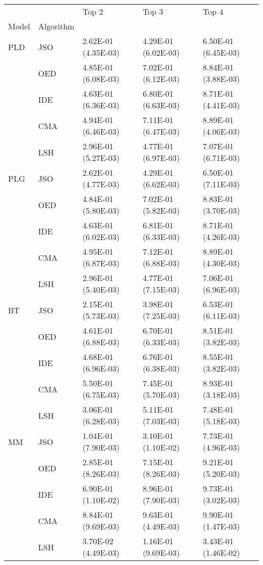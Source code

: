\begin{tabular}{lllll}
\toprule
   &     &                Top 2 &                Top 3 &                Top 4 \\
Model & Algorithm &                      &                      &                      \\
\midrule
PLD & JSO &  2.62E-01 (4.35E-03) &  4.29E-01 (6.02E-03) &  6.50E-01 (6.45E-03) \\
   & OED &  4.85E-01 (6.08E-03) &  7.02E-01 (6.12E-03) &  8.84E-01 (3.88E-03) \\
   & IDE &  4.63E-01 (6.36E-03) &  6.80E-01 (6.63E-03) &  8.71E-01 (4.41E-03) \\
   & CMA &  4.94E-01 (6.46E-03) &  7.11E-01 (6.47E-03) &  8.89E-01 (4.06E-03) \\
   & LSH &  2.96E-01 (5.27E-03) &  4.77E-01 (6.97E-03) &  7.07E-01 (6.71E-03) \\
PLG & JSO &  2.62E-01 (4.77E-03) &  4.29E-01 (6.62E-03) &  6.50E-01 (7.11E-03) \\
   & OED &  4.84E-01 (5.80E-03) &  7.02E-01 (5.82E-03) &  8.83E-01 (3.70E-03) \\
   & IDE &  4.63E-01 (6.02E-03) &  6.81E-01 (6.33E-03) &  8.71E-01 (4.26E-03) \\
   & CMA &  4.95E-01 (6.87E-03) &  7.12E-01 (6.88E-03) &  8.89E-01 (4.30E-03) \\
   & LSH &  2.96E-01 (5.40E-03) &  4.77E-01 (7.15E-03) &  7.06E-01 (6.96E-03) \\
BT & JSO &  2.15E-01 (5.73E-03) &  3.98E-01 (7.25E-03) &  6.53E-01 (6.11E-03) \\
   & OED &  4.61E-01 (6.88E-03) &  6.70E-01 (6.33E-03) &  8.51E-01 (3.82E-03) \\
   & IDE &  4.68E-01 (6.96E-03) &  6.76E-01 (6.38E-03) &  8.55E-01 (3.82E-03) \\
   & CMA &  5.50E-01 (6.75E-03) &  7.45E-01 (5.70E-03) &  8.93E-01 (3.18E-03) \\
   & LSH &  3.06E-01 (6.28E-03) &  5.11E-01 (7.03E-03) &  7.48E-01 (5.18E-03) \\
MM & JSO &  1.04E-01 (7.90E-03) &  3.10E-01 (1.10E-02) &  7.73E-01 (4.96E-03) \\
   & OED &  2.85E-01 (8.26E-03) &  7.15E-01 (8.26E-03) &  9.21E-01 (5.20E-03) \\
   & IDE &  6.90E-01 (1.10E-02) &  8.96E-01 (7.90E-03) &  9.73E-01 (3.02E-03) \\
   & CMA &  8.84E-01 (9.69E-03) &  9.63E-01 (4.49E-03) &  9.90E-01 (1.47E-03) \\
   & LSH &  3.70E-02 (4.49E-03) &  1.16E-01 (9.69E-03) &  3.43E-01 (1.46E-02) \\
\bottomrule
\end{tabular}
